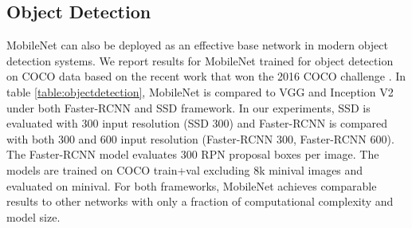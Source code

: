 \documentclass[10pt,twocolumn,letterpaper]{article}
\begin{document}
\begin{table}[t]
\setlength\tabcolsep{3pt}
  \caption{Face attribute classification using the MobileNet architecture. Each row corresponds to a different hyper-parameter setting (width multiplier  and image resolution).} \centering {}
\end{table}

\subsection{Object Detection}

MobileNet can also be deployed as an effective base network in modern object detection systems.
We report results for MobileNet trained for object detection on COCO data based on the recent work that won the 2016 COCO challenge \cite{cocodetection2016}.
In table \ref{table:objectdetection}, MobileNet is compared to VGG and Inception V2 \cite{ioffe2015batch} under both Faster-RCNN \cite{ren2015faster} and SSD \cite{liu2015ssd} framework.
In our experiments, SSD is evaluated with 300 input resolution (SSD 300) and Faster-RCNN is compared with both 300 and 600 input resolution (Faster-RCNN 300, Faster-RCNN 600).
The Faster-RCNN model evaluates 300 RPN proposal boxes per image. The models are trained on COCO train+val excluding 8k minival images and evaluated on minival.
For both frameworks, MobileNet achieves comparable results to other networks with only a fraction of computational complexity and model size.
\end{document}
